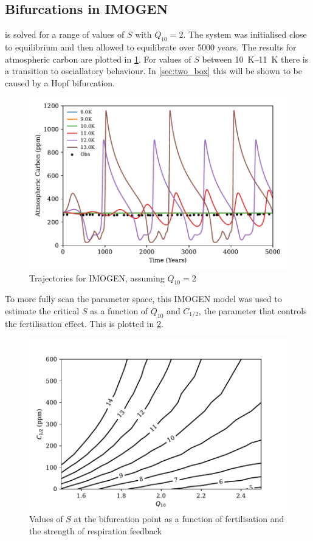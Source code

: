 \subsection{Bifurcations in IMOGEN}
 is solved for a range of values of $S$ with $Q_{10} = 2$. The system was initialised close to equilibrium and then allowed to equilibrate over 5000 years.
The results for atmospheric carbon are plotted in \cref{fig:imogen_trajectories}. For values of $S$ between \SIrange{10}{11}{\kelvin} there is a
transition to osciallatory behaviour. In \cref{sec:two_box} this will be shown to be caused by a Hopf bifurcation.
\begin{figure}
  \centering
  \includegraphics[width=\textwidth,keepaspectratio]{imogen_traj}
  \caption{Trajectories for IMOGEN, assuming $Q_{10} = 2$}
  \label{fig:imogen_trajectories}
\end{figure}

To more fully scan the parameter space, this IMOGEN model was used to estimate the critical $S$ as a function of $Q_{10}$ and $C_{1/2}$,
the parameter that controls the  fertilisation effect. This is plotted in \cref{fig:imogen_bifurcation_plane}.

\begin{figure}
  \centering
  \includegraphics[keepaspectratio,width=\textwidth]{imogen_critical_S_Q10_ca05}
  \caption{Values of $S$ at the bifurcation point as a function of  fertilisation and the strength of respiration feedback}
  \label{fig:imogen_bifurcation_plane}
\end{figure}

